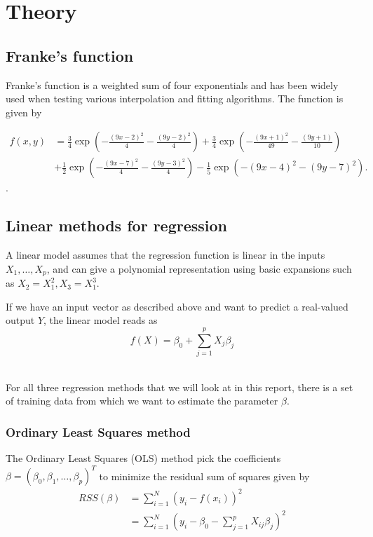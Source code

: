 \section{Theory}

\subsection{Franke's function}

Franke's function is a weighted sum of four exponentials and has been 
widely used when testing various interpolation and fitting algorithms.
The function is given by 

\begin{align*}
	f(x,y) &= 
	\frac{3}{4}\exp{\left(-\frac{(9x-2)^2}{4} 
	- \frac{(9y-2)^2}{4}\right)}
	+\frac{3}{4}\exp{\left(-\frac{(9x+1)^2}{49}
	- \frac{(9y+1)}{10}\right)} \\
	&+\frac{1}{2}\exp{\left(-\frac{(9x-7)^2}{4} 
	- \frac{(9y-3)^2}{4}\right)} 
	-\frac{1}{5}\exp{\left(-(9x-4)^2 - (9y-7)^2\right) }.
\end{align*}. 
~\cite{Project1}

\subsection{Linear methods for regression}

A linear model assumes that the regression function is linear in the 
inputs \(X_1, \dots, X_p\), and can give a polynomial representation
using basic expansions such as \(X_2 = X_1^2, X_3 = X_1^3\). 

If we have an input vector as described above and want to predict 
a real-valued output \(Y\), the linear model reads as
\begin{equation}
	f(X) = \beta_0 + \sum\limits_{j=1}^p X_j\beta_j
\end{equation}
~\cite{IntroStatistics}

For all three regression methods that we will look at in this report, 
there is a set of training data from which we want to estimate the parameter 
\(\beta\). 

\subsubsection{Ordinary Least Squares method}
The Ordinary Least Squares (OLS) method pick the coefficients
\(\beta = (\beta_0, \beta_1, \dots, \beta_p)^T\) to minimize the 
residual sum of squares given by
\begin{align}
	RSS(\beta) &= \sum\limits_{i=1}^N (y_i - f(x_i))^2\\
				&= \sum\limits_{i=1}^N 
				(y_i - \beta_0 - \sum\limits_{j=1}^p X_{ij}\beta_j )^2\\
\end{align}

